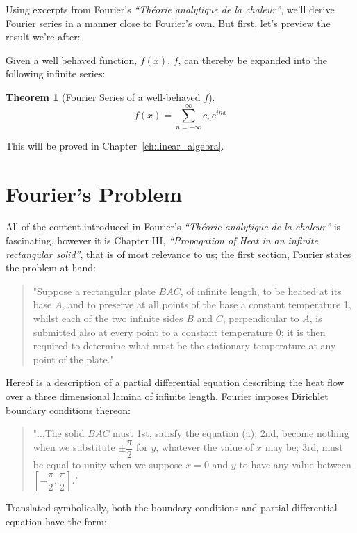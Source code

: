 \documentclass[12pt,a4paper]{report}
\theoremstyle{thms}
\newtheorem{theorem}{Theorem}[section]
\theoremstyle{defns}
\begin{document}
Using excerpts from Fourier's \textit{``Théorie analytique de la chaleur''}, we'll derive Fourier series in a manner close to Fourier's own. But first, let's preview the result we're after:

Given a well behaved function, $f(x)$, $f$, can thereby be expanded into the following infinite series:
\begin{theorem}[Fourier Series of a well-behaved $f$]
    \begin{equation}
        f(x) = \sum_{n=-\infty}^{\infty} c_ne^{inx}
    \end{equation}
\end{theorem}

This will be proved in Chapter~\ref{ch:linear_algebra}.

\section{Fourier's Problem}
All of the content introduced in Fourier's \textit{``Théorie analytique de la chaleur''} is fascinating, however it is Chapter III, \textit{``Propagation of Heat in an infinite rectangular solid''}, that is of most relevance to us; the first section, Fourier states the problem at hand:

\begin{quote}"Suppose a rectangular plate $BAC$, of infinite length, to be heated at its base $A$, and to preserve at all points of the base a constant temperature 1, whilst each of the two infinite sides $B$ and $C$, perpendicular to $A$, is submitted also at every point to a constant temperature 0; it is then required to determine what must be the stationary temperature at any point of the plate." \cite{heat_fourier}
\end{quote}

Hereof is a description of a partial differential equation describing the heat flow over a three dimensional lamina of infinite length. Fourier imposes Dirichlet boundary conditions thereon:

\begin{quote}
    "...The solid $BAC$ must 1st, satisfy the equation (a); 2nd, become nothing when we substitute $\pm\dfrac{\pi}{2}$ for $y$, whatever the value of $x$ may be; 3rd, must be equal to unity when we suppose $x=0$
    and $y$ to have any value between $[-\dfrac{\pi}{2}, \dfrac{\pi}{2}]$." \cite{heat_fourier}
\end{quote}

Translated symbolically, both the boundary conditions and partial differential equation have the form:
\end{document}
